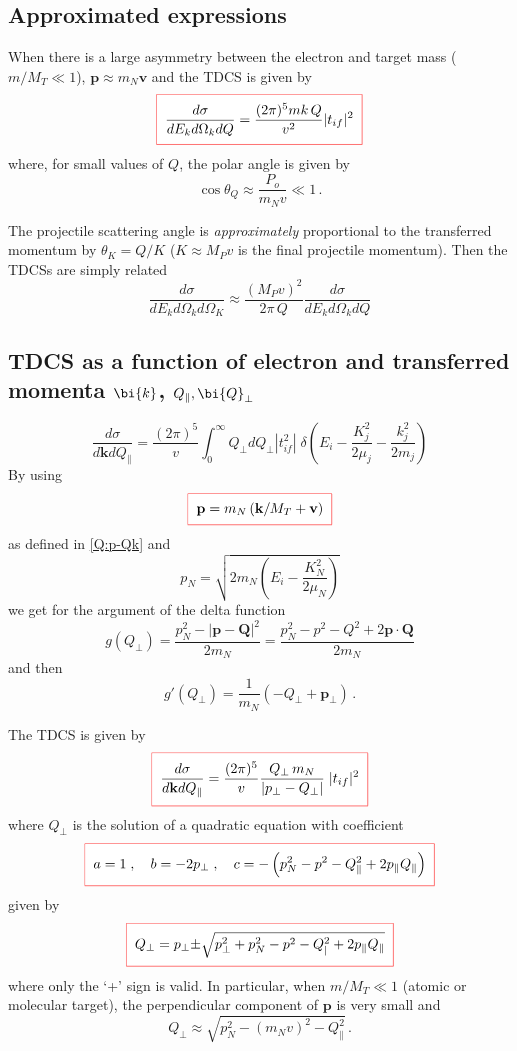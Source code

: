 \subsection*{Approximated expressions}

When there is a large asymmetry between the electron and target mass
($m/M_{T} \ll 1$), $\bm{p} \approx m_N \bm{v}$ and the TDCS is given by
\begin{equation}\label{Q:5xsEkWkQapp}
\fbeq{ \frac{d\sigma}{d E_{k} d\Omega_{k}d Q} = \frac{(2
\pi)^{5} m k \, Q}{v^{2}} | t_{if}| ^{2}}
\end{equation}
%
where, for small values of $Q$, the polar angle is given by
$$
\cos{\theta_{Q}} \approx \frac{P_{o}}{m_{N} v} \ll 1 \, .
$$

The projectile scattering angle is \emph{approximately} proportional to
the transferred momentum by $\theta_{K} = Q/K$ ($K \approx M_{P} v$ is
the final projectile momentum). Then the TDCSs are simply related
$$
\frac{d\sigma}{d E_{k} d\Omega_{k}d \Omega_K} \approx
\frac{(M_{P} v)^{2}}{2 \pi \, Q} \frac{d\sigma}{d E_{k}
d\Omega_{k}d Q}
$$



\subsection{TDCS as a function of electron and transferred
momenta $\bi{k}$, $Q_{\parallel }, \bi{Q}_{\perp}$}

$$
\frac{d \sigma}{d \bm{k} d Q_{\parallel }} = \frac{(2
\pi)^{5}}{v} \int_{0}^{\infty} Q_{\perp} d Q_{\perp} |
t_{if}^{2}|  \; \delta \left( E_{i} - \frac{K_{j}^{2}}{2 \mu_{j}} -
\frac{k_{j}^{2}}{2 m_{j}}\right)
$$
%
By using
$$
  \fbeq{
\bm{p}= m_{N} \left( \bm{k}/M_{T} + \bm{v} \right)
  }
$$
%
as defined in \ref{Q:p-Qk} and
$$
p_{N} = \sqrt{2m_{N}\left( E_{i} - \frac{K_{N}^{2}}{2 \mu_{N}} \right)}
$$
%
we get for the argument of the delta function
%
$$
g(Q_{\perp}) = \frac{p_{N}^{2} - | \bm{p}- \bm{Q}| ^{2}}{2 m_{N}}
= \frac{p_{N}^{2} - p^{2} - Q^{2} + 2 \bm{p}\cdot \bm{Q}}{2 m_{N}}
$$
%
and then
$$
g'(Q_{\perp}) = \frac{1}{m_{N}}\left( - Q_{\perp} + \bm{p}_{\perp}
\right) \, .
$$

The TDCS is given by
%
\begin{equation}\label{Q:tdcsqpar}
  \fbeq{
\frac{d \sigma}{d \bm{k} d Q_{\parallel }} = \frac{(2
\pi)^{5}}{v} \frac{Q_{\perp} \, m_{N}}{| p_{\perp}- Q_{\perp} | }
\; | t_{if}| ^{2} }
\end{equation}
%
where $Q_{\perp}$ is the solution of a quadratic equation with
coefficient
$$
  \fbeq{
a=1\;, \quad b= - 2 p_{\perp} \;, \quad c= - \left( p_{N}^{2} - p^{2} -
Q_{\parallel }^{2} + 2 p_{\parallel } Q_{\parallel } \right)
  }
$$
%
given by
%
\begin{equation}\label{Q:qperp}
  \fbeq{
Q_{\perp} =  p_{\perp} {\pm} \sqrt{p_{\perp}^{2} + p_{N}^{2} - p^{2} -
Q_{| }^{2} + 2 p_{\parallel } Q_{\parallel }}
    }
\end{equation}
%
where only the `+' sign is valid. In particular, when $m/M_{T} \ll 1$
(atomic or molecular target), the perpendicular component of $\bm{p}$
is very small and
$$
Q_{\perp} \approx \sqrt{p_{N}^{2} - (m_{N} v)^{2} - Q_{\parallel
}^{2}} \,.
$$


